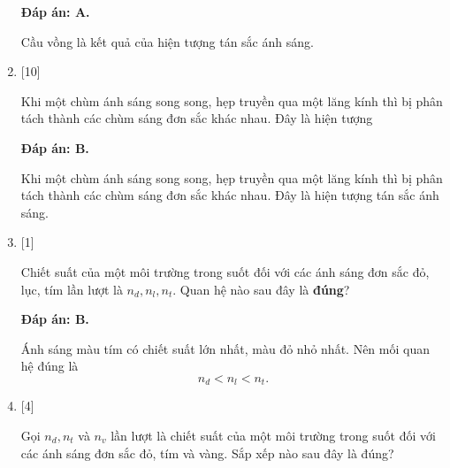 \begin{enumerate}[label=\bfseries Câu \arabic*:]
	\loigiai
	{		\textbf{Đáp án: A.}
		
		Cầu vồng là kết quả của hiện tượng tán sắc ánh sáng.
		
	}
	
	\item {} [10]
	\cauhoi
	{Khi một chùm ánh sáng song song, hẹp truyền qua một lăng kính thì bị phân tách thành các chùm sáng đơn sắc khác nhau. Đây là hiện tượng
	}
	
	\loigiai
	{		\textbf{Đáp án: B.}
		
		Khi một chùm ánh sáng song song, hẹp truyền qua một lăng kính thì bị phân tách thành các chùm sáng đơn sắc khác nhau. Đây là hiện tượng tán sắc ánh sáng.
		
	}
	
	\item {} [1]
	\cauhoi
	{Chiết suất của một môi trường trong suốt đối với các ánh sáng đơn sắc đỏ, lục, tím lần lượt là $n_{d}, n_{l}, n_{t}$. Quan hệ nào sau đây là \textbf{đúng}?
	}
	
	\loigiai
	{		\textbf{Đáp án: B.}
		
		Ánh sáng màu tím có chiết suất lớn nhất, màu đỏ nhỏ nhất. Nên mối quan hệ đúng là
		$$
		n_{d} < n_{l} < n_{t}.
		$$
		
	}
	

	
	\item {} [4]
	\cauhoi
	{Gọi $n_{d}, n_{t}$ và $n_{v}$ lần lượt là chiết suất của một môi trường trong suốt đối với các ánh sáng đơn sắc đỏ, tím và vàng. Sắp xếp nào sau đây là đúng?
	}
	

\end{enumerate}
